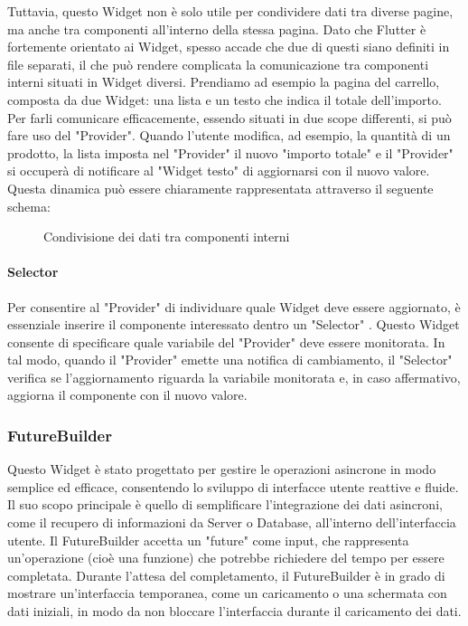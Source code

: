 \noindent
Tuttavia, questo Widget non è solo utile per condividere dati tra diverse pagine, ma anche tra componenti all'interno della stessa pagina. Dato che Flutter è fortemente orientato ai Widget, spesso accade che due di questi siano definiti in file separati, il che può rendere complicata la comunicazione tra componenti interni situati in Widget diversi. Prendiamo ad esempio la pagina del carrello, composta da due Widget: una lista e un testo che indica il totale dell'importo. Per farli comunicare efficacemente, essendo situati in due scope differenti, si può fare uso del "Provider". Quando l'utente modifica, ad esempio, la quantità di un prodotto, la lista imposta nel "Provider" il nuovo "importo totale" e il "Provider" si occuperà di notificare al "Widget testo" di aggiornarsi con il nuovo valore. Questa dinamica può essere chiaramente rappresentata attraverso il seguente schema:
\begin{figure}[H]
	\centering
	\caption{Condivisione dei dati tra componenti interni}
	\label{fig:provider_example3}
\end{figure}

\noindent

\paragraph{Selector}
Per consentire al "Provider" di individuare quale Widget deve essere aggiornato, è essenziale inserire il componente interessato dentro un "Selector" \cite{selector}. Questo Widget consente di specificare quale variabile del "Provider" deve essere monitorata. In tal modo, quando il "Provider" emette una notifica di cambiamento, il "Selector" verifica se l'aggiornamento riguarda la variabile monitorata e, in caso affermativo, aggiorna il componente con il nuovo valore.

\subsubsection{FutureBuilder} \label{subsub:futurebuilder}
Questo Widget è stato progettato per gestire le operazioni asincrone in modo semplice ed efficace, consentendo lo sviluppo di interfacce utente reattive e fluide. Il suo scopo principale è quello di semplificare l'integrazione dei dati asincroni, come il recupero di informazioni da Server o Database, all'interno dell'interfaccia utente. Il FutureBuilder \cite{future_builder} accetta un "future" come input, che rappresenta un'operazione (cioè una funzione) che potrebbe richiedere del tempo per essere completata. Durante l'attesa del completamento, il FutureBuilder è in grado di mostrare un'interfaccia temporanea, come un caricamento o una schermata con dati iniziali, in modo da non bloccare l'interfaccia durante il caricamento dei dati.


